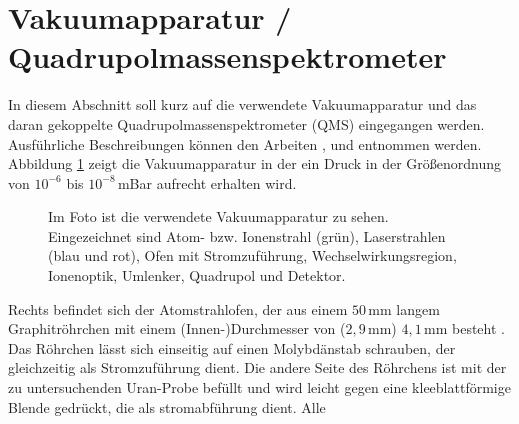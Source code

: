 \section{Vakuumapparatur /
Quadrupolmassenspektrometer}\label{sec:vakuumapparatur_qms}
In diesem Abschnitt soll kurz auf die verwendete Vakuumapparatur und das daran
gekoppelte Quadrupolmassenspektrometer (QMS) eingegangen werden. Ausführliche
Beschreibungen können den Arbeiten
\cite{blaum:1997:diplomarbeit},\cite{geppert:2005:dissertation} und \cite{schumann:2005:dissertation}
entnommen werden. Abbildung \ref{fig:vakuumapparatur_foto} zeigt die
Vakuumapparatur in der ein Druck in der Größenordnung von $10^{-6}$ bis
$10^{-8}\,$mBar aufrecht erhalten wird.\par
\begin{figure}[h]
 	\centering
	\caption[Vakuumapparatur]{Im Foto ist die verwendete Vakuumapparatur zu sehen.
	Eingezeichnet sind Atom- bzw. Ionenstrahl (grün), Laserstrahlen (blau und rot),
	Ofen mit Stromzuführung, Wechselwirkungsregion, Ionenoptik, Umlenker,
	Quadrupol und Detektor.}\label{fig:vakuumapparatur_foto}
\end{figure}
Rechts befindet sich der Atomstrahlofen, der aus einem $50\,$mm langem
Graphitröhrchen mit einem (Innen-)Durchmesser von ($2,9\,$mm) $4,1\,$mm besteht \cite{raeder:2006:diplomarbeit}. Das Röhrchen lässt sich einseitig auf einen
Molybdänstab schrauben, der gleichzeitig als Stromzuführung dient. Die andere
Seite des Röhrchens ist mit der zu untersuchenden Uran-Probe befüllt und wird
leicht gegen eine kleeblattförmige Blende gedrückt, die als stromabführung dient. Alle
